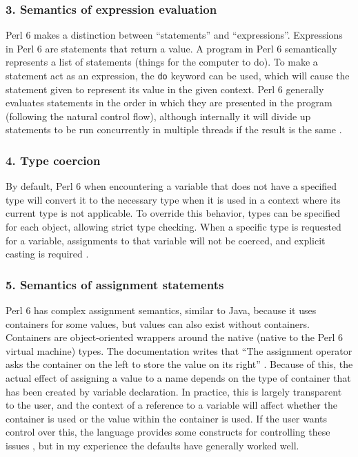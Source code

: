 \documentclass[14pt,english]{extarticle}
\begin{document}
\subsubsection*{3. Semantics of expression evaluation}

Perl 6 makes a distinction between ``statements'' and ``expressions''.
Expressions in Perl 6 are statements that return a value. A program
in Perl 6 semantically represents a list of statements (things for
the computer to do). To make a statement act as an expression, the
\texttt{do} keyword can be used, which will cause the statement given
to represent its value in the given context. Perl 6 generally evaluates
statements in the order in which they are presented in the program
(following the natural control flow), although internally it will
divide up statements to be run concurrently in multiple threads if
the result is the same \cite{Documentation}.


\subsubsection*{4. Type coercion}

By default, Perl 6 when encountering a variable that does not have
a specified type will convert it to the necessary type when it is
used in a context where its current type is not applicable. To override
this behavior, types can be specified for each object, allowing strict
type checking. When a specific type is requested for a variable, assignments
to that variable will not be coerced, and explicit casting is required
\cite{Documentation}.


\subsubsection*{5. Semantics of assignment statements}

Perl 6 has complex assignment semantics, similar to Java, because
it uses containers for some values, but values can also exist without
containers. Containers are object-oriented wrappers around the native
(native to the Perl 6 virtual machine) types. The documentation writes
that ``The assignment operator asks the container on the left to
store the value on its right'' \cite{Documentation}. Because of
this, the actual effect of assigning a value to a name depends on
the type of container that has been created by variable declaration.
In practice, this is largely transparent to the user, and the context
of a reference to a variable will affect whether the container is
used or the value within the container is used. If the user wants
control over this, the language provides some constructs for controlling
these issues \cite{Documentation}, but in my experience the defaults
have generally worked well.
\end{document}
